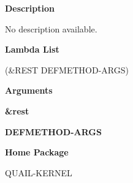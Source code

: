  
{\bf Description}

No description available.

 
{\bf Lambda List}

(\&REST DEFMETHOD-ARGS)

 
{\bf Arguments}


\beginhang
{\bf \&rest}\hspace{2em}
 
{\bf DEFMETHOD-ARGS}


 
\endhang
 
{\bf Home Package}

QUAIL-KERNEL

